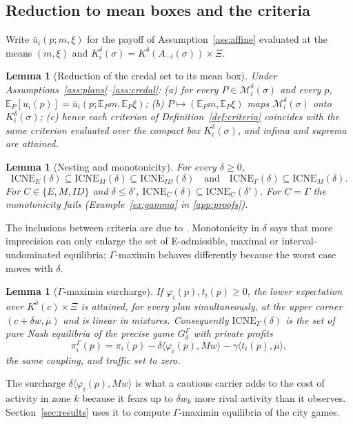 \documentclass[preprint,12pt]{elsarticle}
\newtheorem{lemma}[theorem]{Lemma}
\theoremstyle{definition}
\theoremstyle{remark}
\newcommand{\E}{\mathbb{E}}
\newcommand{\cM}{\mathcal{M}}
\newcommand{\ub}{\bar u}
\newcommand{\ICNE}{\mathrm{ICNE}}
\newcommand{\ip}[2]{\langle #1,#2\rangle}
\begin{document}
\subsection{Reduction to mean boxes and the criteria}

Write $\ub_i(p;m,\xi)$ for the payoff of Assumption~\ref{ass:affine} evaluated at the means $(m,\xi)$ and $K_i^\delta(\sigma)=K^\delta(A_{-i}(\sigma))\times\Xi$.

\begin{lemma}[Reduction of the credal set to its mean box]\label{lem:reduction}
Under Assumptions~\ref{ass:plans}--\ref{ass:credal}: (a) for every $P\in\cM_i^\delta(\sigma)$ and every $p$, $\E_P[u_i(p)]=\ub_i(p;\E_Pm,\E_P\xi)$; (b) $P\mapsto(\E_Pm,\E_P\xi)$ maps $\cM_i^\delta(\sigma)$ onto $K_i^\delta(\sigma)$; (c) hence each criterion of Definition~\ref{def:criteria} coincides with the same criterion evaluated over the compact box $K_i^\delta(\sigma)$, and infima and suprema are attained.
\end{lemma}

\begin{lemma}[Nesting and monotonicity]\label{lem:nesting}
For every $\delta\ge0$, \[\ICNE_E(\delta)\subseteq\ICNE_M(\delta)\subseteq\ICNE_{ID}(\delta)\quad\text{and}\quad\ICNE_\Gamma(\delta)\subseteq\ICNE_M(\delta).\] For $C\in\{E,M,ID\}$ and $\delta\le\delta'$, $\ICNE_C(\delta)\subseteq\ICNE_C(\delta')$. For $C=\Gamma$ the monotonicity fails (Example~\ref{ex:gamma} in \ref{app:proofs}).
\end{lemma}

The inclusions between criteria are due to \citet{Troffaes2007}. Monotonicity in $\delta$ says that more imprecision can only enlarge the set of E-admissible, maximal or interval-undominated equilibria; $\Gamma$-maximin behaves differently because the worst case moves with $\delta$.

\begin{lemma}[$\Gamma$-maximin surcharge]\label{lem:gamma}
If $\varphi_i(p),t_i(p)\ge0$, the lower expectation over $K^\delta(c)\times\Xi$ is attained, for every plan simultaneously, at the upper corner $(c+\delta w,\overline\mu)$ and is linear in mixtures. Consequently $\ICNE_\Gamma(\delta)$ is the set of pure Nash equilibria of the precise game $G^\Gamma_\delta$ with private profits
\[
\pi_i^\Gamma(p)=\pi_i(p)-\delta\ip{\varphi_i(p)}{Mw}-\gamma\ip{t_i(p)}{\overline\mu},
\]
the same coupling, and traffic set to zero.
\end{lemma}

The surcharge $\delta\ip{\varphi_i(p)}{Mw}$ is what a cautious carrier adds to the cost of activity in zone $k$ because it fears up to $\delta w_k$ more rival activity than it observes. Section~\ref{sec:results} uses it to compute $\Gamma$-maximin equilibria of the city games.
\end{document}
